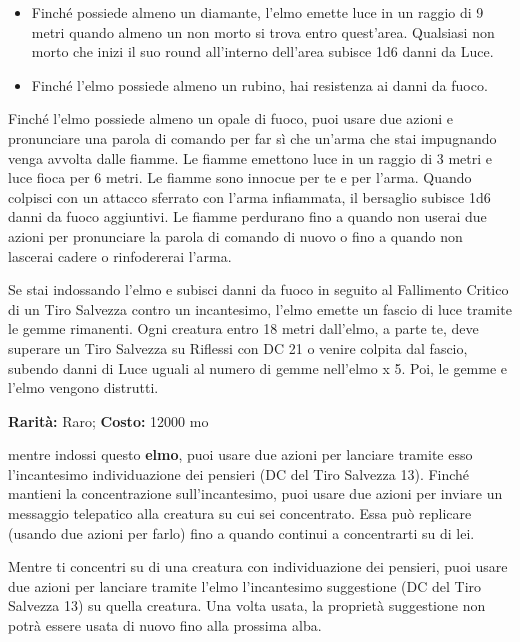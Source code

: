 \begin{multicols}{2}
\begin{itemize}[leftmargin=*]
\item
Finché possiede almeno un diamante, l'elmo emette luce in un raggio di 9 metri quando almeno un non morto si trova entro quest'area. Qualsiasi non morto che inizi il suo round all'interno dell'area subisce 1d6 danni da Luce.

\item
Finché l'elmo possiede almeno un rubino, hai resistenza ai danni da fuoco.
\end{itemize}

\smallskip

Finché l'elmo possiede almeno un opale di fuoco, puoi usare due azioni e pronunciare una parola di comando per far sì che un'arma che stai impugnando venga avvolta dalle fiamme. Le fiamme emettono luce in un raggio di 3 metri e luce fioca per 6 metri. Le fiamme sono innocue per te e per l'arma. Quando colpisci con un attacco sferrato con l'arma infiammata, il bersaglio subisce 1d6 danni da fuoco aggiuntivi. Le fiamme perdurano fino a quando non userai due azioni per pronunciare la parola di comando di nuovo o fino a quando non lascerai cadere o rinfodererai l'arma.

Se stai indossando l'elmo e subisci danni da fuoco in seguito al Fallimento Critico di un Tiro Salvezza contro un incantesimo, l'elmo emette un fascio di luce tramite le gemme rimanenti. Ogni creatura entro 18 metri dall'elmo, a parte te, deve superare un Tiro Salvezza su Riflessi con DC 21 o venire colpita dal fascio, subendo danni di Luce uguali al numero di gemme nell'elmo x 5. Poi, le gemme e l'elmo vengono distrutti.


\textbf{Rarità:} Raro; \textbf{Costo:} 12000 mo

mentre indossi questo \textbf{elmo}, puoi usare due azioni per lanciare tramite esso l'incantesimo individuazione dei pensieri (DC del Tiro Salvezza 13). Finché mantieni la concentrazione sull'incantesimo, puoi usare due azioni per inviare un messaggio telepatico alla creatura su cui sei concentrato. Essa può replicare (usando due azioni per farlo) fino a quando continui a concentrarti su di lei.

Mentre ti concentri su di una creatura con individuazione dei pensieri, puoi usare due azioni per lanciare tramite l'elmo l'incantesimo suggestione (DC del Tiro Salvezza 13) su quella creatura. Una volta usata, la proprietà suggestione non potrà essere usata di nuovo fino alla prossima alba.


\end{multicols}
